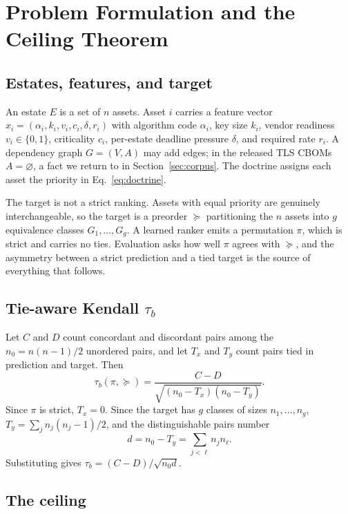 \documentclass[journal,10pt]{IEEEtran}
\newcommand{\tb}{\tau_b}
\newcommand{\distinct}{d}
\newcommand{\nzero}{n_0}
\begin{document}
\section{Problem Formulation and the Ceiling Theorem}
\label{sec:ceiling}

\subsection{Estates, features, and target}

An estate $E$ is a set of $n$ assets. Asset $i$ carries a feature vector
$x_i=(\alpha_i,k_i,v_i,c_i,\delta,r_i)$ with algorithm code $\alpha_i$, key size $k_i$, vendor
readiness $v_i\in\{0,1\}$, criticality $c_i$, per-estate deadline pressure $\delta$, and required
rate $r_i$. A dependency graph $G=(V,A)$ may add edges; in the released TLS CBOMs $A=\varnothing$,
a fact we return to in Section~\ref{sec:corpus}. The doctrine assigns each asset the priority in
Eq.~\eqref{eq:doctrine}.

The target is not a strict ranking. Assets with equal priority are genuinely interchangeable, so
the target is a preorder $\succeq$ partitioning the $n$ assets into $g$ equivalence classes
$G_1,\dots,G_g$. A learned ranker emits a permutation $\pi$, which is strict and carries no ties.
Evaluation asks how well $\pi$ agrees with $\succeq$, and the asymmetry between a strict prediction
and a tied target is the source of everything that follows.

\subsection{Tie-aware Kendall $\tb$}

Let $C$ and $D$ count concordant and discordant pairs among the $\nzero=n(n-1)/2$ unordered pairs,
and let $T_x$ and $T_y$ count pairs tied in prediction and target. Then
\begin{equation}
\tb(\pi,\succeq)=\frac{C-D}{\sqrt{(\nzero-T_x)(\nzero-T_y)}}.
\label{eq:taub}
\end{equation}
Since $\pi$ is strict, $T_x=0$. Since the target has $g$ classes of sizes $n_1,\dots,n_g$,
$T_y=\sum_j n_j(n_j-1)/2$, and the distinguishable pairs number
\begin{equation}
\distinct=\nzero-T_y=\sum_{j<\ell} n_j n_\ell .
\label{eq:d}
\end{equation}
Substituting gives $\tb=(C-D)/\sqrt{\nzero\distinct}$.

\subsection{The ceiling}
\end{document}
